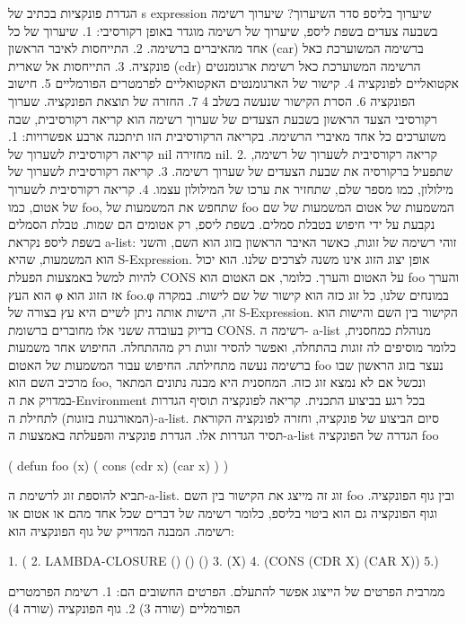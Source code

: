       הגדרת פונקציות בכתיב של s expression
      שיערוך בליספ
      סדר השיערוך?
      שיערוך רשימה בשבעה צעדים
      בשפת ליספ, שיערוך של רשימה מוגדר באופן רקורסיבי:
      1. שיערוך של כל אחד מהאיברים ברשימה.
      2. התייחסות לאיבר הראשון (car) ברשימה המשוערכת כאל פונקציה.
      3. התייחסות אל שארית (cdr) הרשימה המשוערכת כאל רשימת ארגומנטים אקטואליים לפונקציה
      4. קישור של הארגומנטים האקטואליים לפרמטרים הפורמליים
      5. חישוב הפונקציה
      6. הסרת הקישור שנעשה בשלב 4
      7. החזרה של תוצאת הפונקציה.
      שערוך רקורסיבי
      הצעד הראשון בשבעת הצעדים של שערוך רשימה הוא קריאה רקורסיבית, שבה משוערכים כל אחד מאיברי הרשימה. בקריאה הרקורסיבית הזו תיתכנה ארבע אפשרויות:
      1. קריאה רקורסיבית לשערוך של nil מחזירה nil.
      2. קריאה רקורסיבית לשערוך של רשימה, שתפעיל ברקורסיה את שבעת הצעדים של שערוך רשימה.
      3. קריאה רקורסיבית לשערוך של מילולון, כמו מספר שלם, שתחזיר את ערכו של המילולון עצמו.
      4. קריאה רקורסיבית לשערוך של אטום, כמו foo, שתחפש את המשמעות של foo
      המשמעות של אטום המשמעות של שם נקבעת על ידי חיפוש בטבלת סמלים. בשפת ליספ, רק
      אטומים הם שמות. טבלת הסמלים בשפת ליספ נקראת a-list: זוהי רשימה של זוגות, כאשר
      האיבר הראשון בזוג הוא השם, והשני הוא המשמעות, שהיא S-Expression. אופן יצוג
      הזוג אינו משנה לצרכים שלנו. הוא יכול להיות למשל באמצעות הפעלת CONS על האטום
      והערך. כלומר, אם האטום הוא foo והערך הוא העץ φ אז הזוג הוא foo.φ במונחים שלנו,
      כל זוג כזה הוא קישור של שם לישות. במקרה זה, הישות אותה ניתן לשיים היא עץ בצורה
      של S-Expression. הקישור בין השם והישות הוא בדיוק בעובדה ששני אלו מחוברים ברשומת
      CONS. רשימה ה- a-list מנוהלת כמחסנית, כלומר מוסיפים לה זוגות בהתחלה, ואפשר
      להסיר זוגות רק מההתחלה. החיפוש אחר משמעות ברשימה נעשה מתחילתה. החיפוש עבור
      המשמעות של האטום foo נעצר בזוג הראשון שבו מרכיב השם הוא foo, ונכשל אם לא נמצא
      זוג כזה. המחסנית היא מבנה נתונים המתאר במדויק את ה-Environment בכל רגע בביצוע
      התכנית. קריאה לפונקציה תוסיף הגדרות (המאורגנות בזוגות) לתחילת ה-a-list. סיום
      הביצוע של פונקציה, וחזרה לפונקציה הקוראת תסיר הגדרות אלו. הגדרת פונקציה
      והפעלתה באמצעות ה-a-list הגדרה של הפונקציה foo
\begin{LISP}
(
 defun
 foo (x)
 (
   cons (cdr x) (car x)
)
)
\end{LISP}

      תביא להוספת זוג לרשימת ה-a-list. זוג זה מייצג את הקישור בין השם foo ובין גוף הפונקציה. וגוף הפונקציה גם הוא ביטוי בליספ, כלומר רשימה של דברים שכל אחד מהם או אטום או רשימה.
      המבנה המדוייק של גוף הפונקציה הוא:
\begin{LISP}
                                 1. (
                                 2. LAMBDA-CLOSURE () () ()
                                 3. (X)
                                 4. (CONS (CDR X) (CAR X))
                                 5.)
\end{LISP}
      ממרבית הפרטים של הייצוג אפשר להתעלם. הפרטים החשובים הם:
      1. רשימת הפרמטרים הפורמליים (שורה 3)
      2. גוף הפונקציה (שורה 4)

